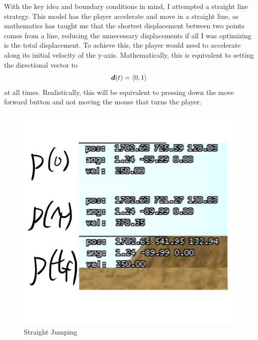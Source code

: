 With the key idea and boundary conditions in mind, I attempted a straight line strategy. This model has the player accelerate and move in a straight line, as mathematics has taught me that the shortest displacement between two points comes from a line, reducing the unnecessary displacements if all I was optimizing is the total displacement. To achieve this, the player would need to accelerate along its initial velocity of the y-axis. Mathematically, this is equivalent to setting the directional vector to
\[
    \boldsymbol{d}(t) = \left\langle 0, 1 \right\rangle
\]
at all times. Realistically, this will be equivalent to pressing down the move forward button and not moving the mouse that turns the player.
\begin{figure}[H]
    \centering
    \begin{minipage}{.5\textwidth}
        \centering
        \includegraphics[width=0.9\linewidth]{assets/2straightjumping.png}
        \caption{Straight Jumping}
        \label{fig:2straightjumping}
    \end{minipage}%
    \begin{minipage}{.5\textwidth}
        \centering

\end{minipage}
\end{figure}
